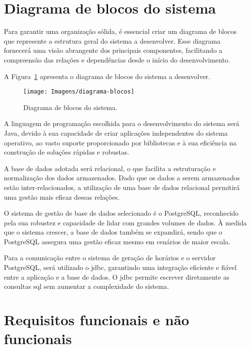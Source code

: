 \section{Diagrama de blocos do sistema}
\label{capitulo3:Diagrama-blocos}

Para garantir uma organização sólida, é essencial criar um diagrama de blocos que represente a estrutura geral do sistema a desenvolver. Esse diagrama fornecerá uma visão abrangente dos principais componentes, facilitando a compreensão das relações e dependências desde o início do desenvolvimento.

A Figura~\ref{fig:diagrama-blocos} apresenta o diagrama de blocos do sistema a desenvolver.

\begin{figure}[htb]
    \centering
    \texttt{[image: Imagens/diagrama-blocos]}
    \caption{Diagrama de blocos do sistema.}
    \label{fig:diagrama-blocos}
\end{figure}

A linguagem de programação escolhida para o desenvolvimento do sistema será Java, devido à sua capacidade de criar aplicações independentes do sistema operativo, ao vasto suporte proporcionado por bibliotecas e à sua eficiência na construção de soluções rápidas e robustas.

A base de dados adotada será relacional, o que facilita a estruturação e normalização dos dados armazenados. Dado que os dados a serem armazenados estão inter-relacionados, a utilização de uma base de dados relacional permitirá uma gestão mais eficaz dessas relações.

O sistema de gestão de base de dados selecionado é o PostgreSQL, reconhecido pela sua robustez e capacidade de lidar com grandes volumes de dados. À medida que o sistema crescer, a base de dados também se expandirá, sendo que o PostgreSQL assegura uma gestão eficaz mesmo em cenários de maior escala.

Para a comunicação entre o sistema de geração de horários e o servidor PostgreSQL, será utilizado o \gls{jdbc}, garantindo uma integração eficiente e fiável entre a aplicação e a base de dados. O \gls{jdbc} permite escrever diretamente as consultas \gls{sql} sem aumentar a complexidade do sistema.

\newpage %

\section{Requisitos funcionais e não funcionais}
\label{capitulo3:Requisitos-funcionais-nao-funcionais}

